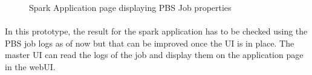 \begin{figure}[h]
    \centering
    \caption{Spark Application page displaying PBS Job properties}
\end{figure}

\paragraph{}
In this prototype, the result for the \gls{spark} application has to be checked
using the PBS job logs as of now but that can be improved once the UI is in
place. The master UI can read the logs of the job and display them on the
application page in the webUI.

